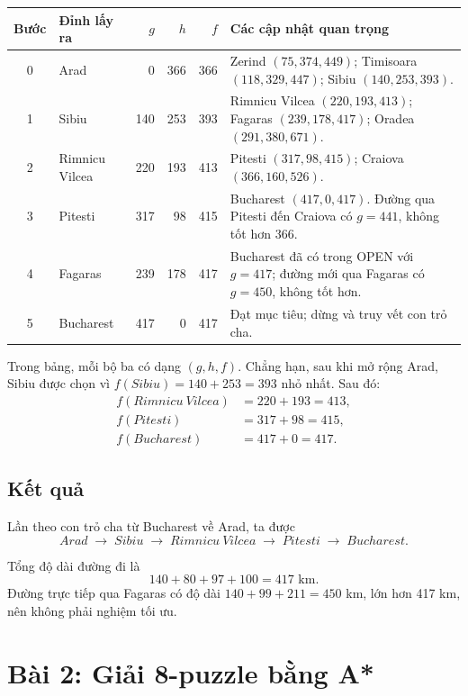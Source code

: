 \documentclass[12pt,a4paper]{article}
\begin{document}
\begin{center}
\renewcommand{\arraystretch}{1.25}
\begin{tabular}{c l r r r p{6.2cm}}
\toprule
Bước & Đỉnh lấy ra & $g$ & $h$ & $f$ & Các cập nhật quan trọng\\
\midrule
0 & Arad & 0 & 366 & 366 & Zerind $(75,374,449)$; Timisoara $(118,329,447)$; Sibiu $(140,253,393)$.\\
1 & Sibiu & 140 & 253 & 393 & Rimnicu Vilcea $(220,193,413)$; Fagaras $(239,178,417)$; Oradea $(291,380,671)$.\\
2 & Rimnicu Vilcea & 220 & 193 & 413 & Pitesti $(317,98,415)$; Craiova $(366,160,526)$.\\
3 & Pitesti & 317 & 98 & 415 & Bucharest $(417,0,417)$. Đường qua Pitesti đến Craiova có $g=441$, không tốt hơn $366$.\\
4 & Fagaras & 239 & 178 & 417 & Bucharest đã có trong OPEN với $g=417$; đường mới qua Fagaras có $g=450$, không tốt hơn.\\
5 & Bucharest & 417 & 0 & 417 & Đạt mục tiêu; dừng và truy vết con trỏ cha.\\
\bottomrule
\end{tabular}
\end{center}

Trong bảng, mỗi bộ ba có dạng $(g,h,f)$. Chẳng hạn, sau khi mở rộng
Arad, Sibiu được chọn vì $f(Sibiu)=140+253=393$ nhỏ nhất. Sau đó:
\[
\begin{aligned}
 f(Rimnicu\ Vilcea)&=220+193=413,\\
 f(Pitesti)&=317+98=415,\\
 f(Bucharest)&=417+0=417.
\end{aligned}
\]

\subsection{Kết quả}

Lần theo con trỏ cha từ Bucharest về Arad, ta được
\[
\boxed{Arad\;\longrightarrow\;Sibiu\;\longrightarrow\;Rimnicu\ Vilcea
\;\longrightarrow\;Pitesti\;\longrightarrow\;Bucharest.}
\]

Tổng độ dài đường đi là
\[
    140+80+97+100=\boxed{417\text{ km}}.
\]
Đường trực tiếp qua Fagaras có độ dài $140+99+211=450$ km, lớn hơn
417 km, nên không phải nghiệm tối ưu.

\section{Bài 2: Giải 8-puzzle bằng A*}
\end{document}
